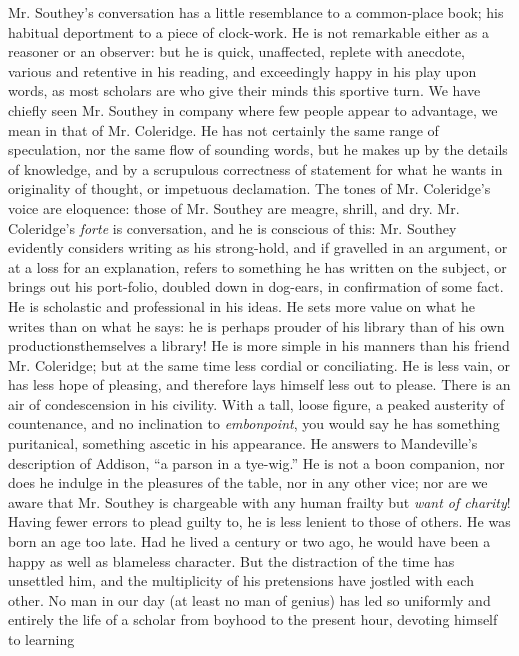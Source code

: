Mr. Southey's conversation has a little resemblance to a
common-place book; his habitual deportment to a piece of
clock-work. He is not remarkable either as a reasoner or an
observer: but he is quick, unaffected, replete with anecdote,
various and retentive in his reading, and exceedingly happy in his
play upon words, as most scholars are who give their minds this
sportive turn. We have chiefly seen Mr. Southey in company where
few people appear to advantage, we mean in that of Mr.
Coleridge. He has not certainly the same range of speculation, nor
the same flow of sounding words, but he makes up by the details of
knowledge, and by a scrupulous correctness of statement for what
he wants in originality of thought, or impetuous declamation. The
tones of Mr. Coleridge's voice are eloquence: those of Mr. Southey
are meagre, shrill, and dry. Mr. Coleridge's \emph{forte} is
conversation, and he is conscious of this: Mr. Southey evidently
considers writing as his strong-hold, and if gravelled in an
argument, or at a loss for an explanation, refers to something he
has written on the subject, or brings out his port-folio, doubled
down in dog-ears, in confirmation of some fact. He is scholastic
and professional in his ideas. He sets more value on what he
writes than on what he says: he is perhaps prouder of his library
than of his own productions\textemdash themselves a library! He is
more simple in his manners than his friend Mr. Coleridge; but at
the same time less cordial or conciliating. He is less vain, or
has less hope of pleasing, and therefore lays himself less out to
please. There is an air of condescension in his civility. With a
tall, loose figure, a peaked austerity of countenance, and no
inclination to \emph{embonpoint}, you would say he has something
puritanical, something ascetic in his appearance. He answers to
Mandeville's description of Addison, ``a parson in a tye-wig.'' He
is not a boon companion, nor does he indulge in the pleasures of
the table, nor in any other vice; nor are we aware that Mr.
Southey is chargeable with any human frailty but\textemdash
\emph{want of charity}!  Having fewer errors to plead guilty to,
he is less lenient to those of others. He was born an age too
late. Had he lived a century or two ago, he would have been a
happy as well as blameless character. But the distraction of the
time has unsettled him, and the multiplicity of his pretensions
have jostled with each other. No man in our day (at least no man
of genius) has led so uniformly and entirely the life of a scholar
from boyhood to the present hour, devoting himself to learning
